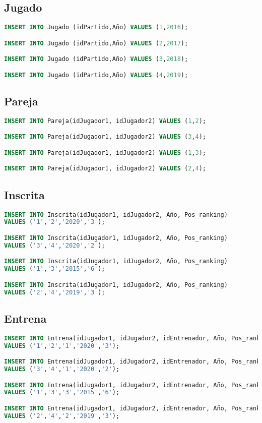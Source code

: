 \pagebreak

\subsection{Jugado}
\begin{lstlisting}[language=sql]
INSERT INTO Jugado (idPartido,Año) VALUES (1,2016);

INSERT INTO Jugado (idPartido,Año) VALUES (2,2017);

INSERT INTO Jugado (idPartido,Año) VALUES (3,2018);

INSERT INTO Jugado (idPartido,Año) VALUES (4,2019);
\end{lstlisting}

\subsection{Pareja}
\begin{lstlisting}[language=sql]
INSERT INTO Pareja(idJugador1, idJugador2) VALUES (1,2);

INSERT INTO Pareja(idJugador1, idJugador2) VALUES (3,4);

INSERT INTO Pareja(idJugador1, idJugador2) VALUES (1,3);

INSERT INTO Pareja(idJugador1, idJugador2) VALUES (2,4);
\end{lstlisting}

\subsection{Inscrita}
\begin{lstlisting}[language=sql]
INSERT INTO Inscrita(idJugador1, idJugador2, Año, Pos_ranking)
VALUES ('1','2','2020','3');

INSERT INTO Inscrita(idJugador1, idJugador2, Año, Pos_ranking)
VALUES ('3','4','2020','2');

INSERT INTO Inscrita(idJugador1, idJugador2, Año, Pos_ranking)
VALUES ('1','3','2015','6');

INSERT INTO Inscrita(idJugador1, idJugador2, Año, Pos_ranking)
VALUES ('2','4','2019','3');
\end{lstlisting}

\subsection{Entrena}
\begin{lstlisting}[language=sql]
INSERT INTO Entrena(idJugador1, idJugador2, idEntrenador, Año, Pos_ranking)
VALUES ('1','2','1','2020','3');

INSERT INTO Entrena(idJugador1, idJugador2, idEntrenador, Año, Pos_ranking)
VALUES ('3','4','1','2020','2');

INSERT INTO Entrena(idJugador1, idJugador2, idEntrenador, Año, Pos_ranking)
VALUES ('1','3','3','2015','6');

INSERT INTO Entrena(idJugador1, idJugador2, idEntrenador, Año, Pos_ranking)
VALUES ('2','4','2','2019','3');
\end{lstlisting}

